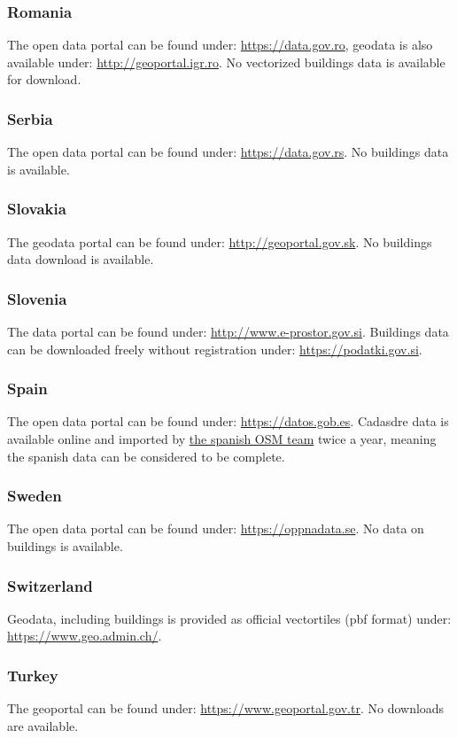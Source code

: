 \documentclass[final, 3p, times, 12pt]{elsarticle} %
\begin{document}
\subsubsection{Romania}
The open data portal can be found under: \url{https://data.gov.ro}, geodata is also available under: \url{http://geoportal.igr.ro}. No vectorized buildings data is available for download.
\subsubsection{Serbia}
The open data portal can be found under: \url{https://data.gov.rs}. No buildings data is available.
\subsubsection{Slovakia}
The geodata portal can be found under: \url{http://geoportal.gov.sk}. No buildings data download is available.
\subsubsection{Slovenia}
The data portal can be found under: \url{http://www.e-prostor.gov.si}. Buildings data can be downloaded freely without registration under: \url{ https://podatki.gov.si}.
\subsubsection{Spain}
The open data portal can be found under: \url{https://datos.gob.es}. Cadasdre data is available online and imported by \href{https://wiki.openstreetmap.org/wiki/Spanish_Cadastre/Buildings_Import}{the spanish OSM team} twice a year, meaning the spanish data can be considered to be complete.
\subsubsection{Sweden}
The open data portal can be found under: \url{https://oppnadata.se}. No data on buildings is available.
\subsubsection{Switzerland}\label{ssdata:Switzerland}
Geodata, including buildings is provided as official vectortiles (pbf format) under: \url{https://www.geo.admin.ch/}.
\subsubsection{Turkey}
The geoportal can be found under: \url{https://www.geoportal.gov.tr}. No downloads are available.
\end{document}
